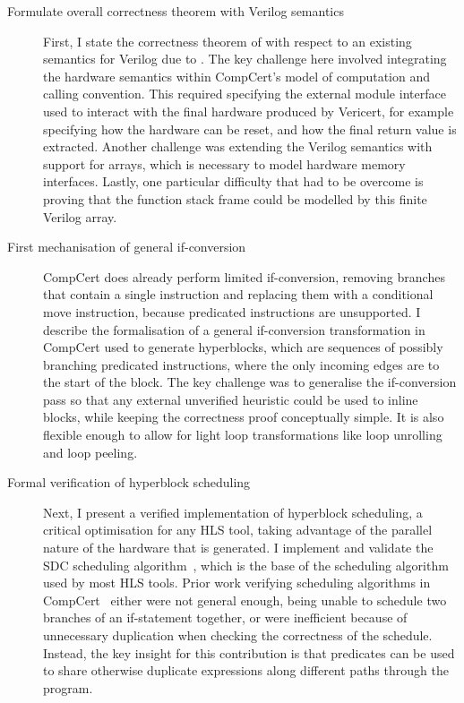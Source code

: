 \begin{description}
\item[Formulate overall correctness theorem with Verilog semantics] First, I
  state the correctness theorem of \vericert{} with respect to an existing
  semantics for Verilog due to \textcite{lööw19_proof_trans_veril_devel_hol}.
  The key challenge here involved integrating the hardware semantics within
  CompCert's model of computation and calling convention.  This required
  specifying the external module interface used to interact with the final
  hardware produced by Vericert, for example specifying how the hardware can be
  reset, and how the final return value is extracted.  Another challenge was
  extending the Verilog semantics with support for arrays, which is necessary to
  model hardware memory interfaces.  Lastly, one particular difficulty that had
  to be overcome is proving that the function stack frame could be modelled by this
  finite Verilog array.

\item[First mechanisation of general if-conversion] CompCert does already
  perform limited \gls{if-conversion}, removing branches that contain a single
  instruction and replacing them with a conditional move instruction, because
  predicated instructions are unsupported.  I describe the formalisation of a
  general if-conversion transformation in CompCert used to generate hyperblocks,
  which are sequences of possibly branching predicated instructions, where the
  only incoming edges are to the start of the block.  The key challenge was to
  generalise the if-conversion pass so that any external unverified heuristic
  could be used to inline blocks, while keeping the correctness proof
  conceptually simple.  It is also flexible enough to allow for light loop
  transformations like loop unrolling and loop peeling.

\item[Formal verification of hyperblock scheduling] Next, I present a verified
  implementation of hyperblock scheduling, a critical optimisation for any
  \gls{HLS} tool, taking advantage of the parallel nature of the hardware that
  is generated.  I implement and validate the \gls{SDC} scheduling
  algorithm~\cite{cong06_sdc}, which is the base of the scheduling algorithm
  used by most \gls{HLS} tools.  Prior work verifying scheduling algorithms in
  CompCert~\cite{tristan08_formal_verif_trans_valid,
    six22_formal_verif_super_sched} either were not general enough, being unable
  to schedule two branches of an if-statement together, or were inefficient
  because of unnecessary duplication when checking the correctness of the
  schedule.  Instead, the key insight for this contribution is that predicates
  can be used to share otherwise duplicate expressions along different paths
  through the program.


\end{description}
